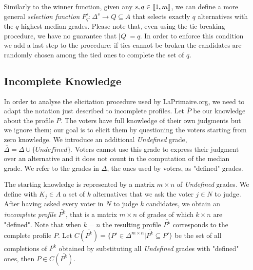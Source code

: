 \documentclass[version=3.21, pagesize, twoside=off, bibliography=totoc, DIV=calc, fontsize=12pt, a4paper]{scrartcl}
\begin{document}
Similarly to the winner function, given any $s,q \in \llbracket1,m\rrbracket$, we can define a more general \emph{selection function} $F^s_q:\Delta^{s} \rightarrow Q \subseteq A$ that selects exactly $q$ alternatives with the $q$ highest median grades. Please note that, even using the tie-breaking procedure, we have no guarantee that $|Q|=q$. In order to enforce this condition we add a last step to the procedure: if ties cannot be broken the candidates are randomly chosen among the tied ones to complete the set of $q$. 

\subsection{Incomplete Knowledge}
In order to analyse the elicitation procedure used by LaPrimaire.org, we need to adapt the notation just described to incomplete profiles. 
 Let $\bar{P}$ be our knowledge about the profile $P$.
The voters have full knowledge of their own judgments but we ignore them; our goal is to elicit them by questioning the voters starting from zero knowledge.
We introduce an additional \emph{Undefined} grade, $\bar{\Delta}=\Delta \cup \{\textit{Undefined}\}$. Voters cannot use this grade to express their judgment over an alternative and it does not count in the computation of the median grade. 
We refer to the grades in $\Delta$, the ones used by voters, as "defined" grades.

The starting knowledge is represented by a matrix $m\times n$ of \textit{Undefined} grades. We define with $K_j \in A$ a set of $k$ alternatives that we ask the voter $j\in N$ to judge. 
After having asked every voter in $N$ to judge $k$ candidates, we obtain an \emph{incomplete profile} $\bar{P^k}$, 
that is a matrix $m \times n$ of grades of which $k \times n$ are "defined". Note that when $k=n$ the resulting profile $\bar{P^k}$ corresponds to the complete profile $P$. Let $C(\bar{P^k}) = \{P' \in \Delta^{m \times n} | \bar{P^k} \subseteq P'\}$ 
be the set of all completions of $\bar{P^k}$ obtained by substituting all \emph{Undefined} grades with "defined" ones, then $P \in C(\bar{P^k})$.
\end{document}
